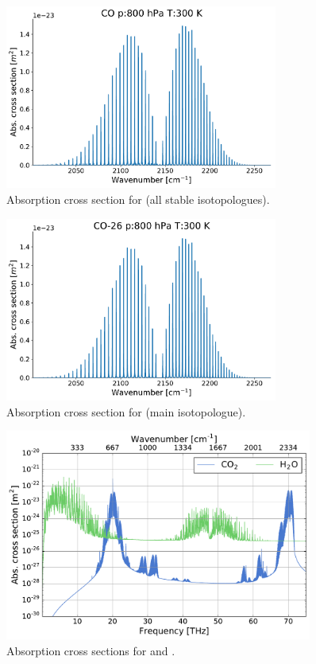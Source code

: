 \documentclass[paper=a4, fontsize=11pt]{scrartcl} %
\begin{document}
\clearpage
\begin{figure}[h!]
  \centering
  \includegraphics[width=0.8\textwidth]{plots/plot_xsec_CO_800hPa_300K.pdf}
  \caption{Absorption cross section for  (all stable isotopologues).}
  \label{fig:abs_xsec_CO}
\end{figure}
\vfill
\begin{figure}[h!]
  \centering
  \includegraphics[width=0.8\textwidth]{plots/plot_xsec_CO-26_800hPa_300K.pdf}
  \caption{Absorption cross section for  (main isotopologue).}
  \label{fig:abs_xsec_CO_main}
\end{figure}

\begin{figure}[ht]
  \includegraphics[angle=90, width=0.9\textwidth]{plots/abs_xsec_overview.pdf}
  \caption{Absorption cross sections for  and .}
  \label{fig:abs_xsec_overview}
\end{figure}
\end{document}
